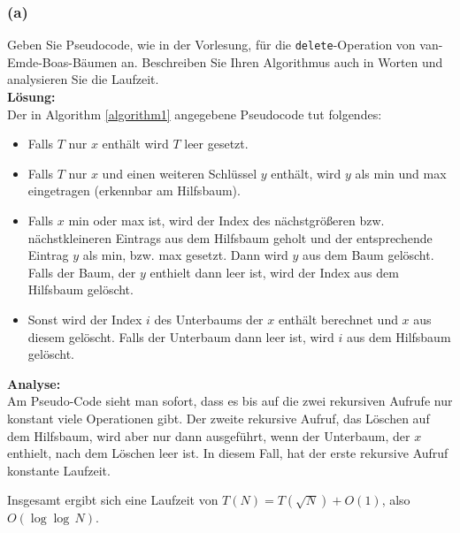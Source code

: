 \subsubsection*{(a)}


Geben Sie Pseudocode, wie in der Vorlesung, für die \lstinline|delete|-Operation von van-Emde-Boas-Bäumen an. Beschreiben Sie Ihren Algorithmus auch in Worten und analysieren Sie die Laufzeit.\\

\noindent\textbf{Lösung:}\\
Der in Algorithm \ref{algorithm1} angegebene Pseudocode tut folgendes:
\begin{itemize}
	\item Falls $T$ nur $x$ enthält wird $T$ leer gesetzt.
	\item Falls $T$ nur $x$ und einen weiteren Schlüssel $y$ enthält, wird $y$ als min und max eingetragen (erkennbar am Hilfsbaum).
	\item Falls $x$ min oder max ist, wird der Index des nächstgrößeren bzw. nächstkleineren Eintrags  aus dem Hilfsbaum geholt und der entsprechende Eintrag $y$ als min, bzw. max gesetzt. Dann wird $y$ aus dem Baum gelöscht. Falls der Baum, der $y$ enthielt dann leer ist, wird der Index aus dem Hilfsbaum gelöscht.
	\item Sonst wird der Index $i$ des Unterbaums der $x$ enthält berechnet und $x$ aus diesem gelöscht. Falls der Unterbaum dann leer ist, wird $i$ aus dem Hilfsbaum gelöscht.
\end{itemize}
\noindent\textbf{Analyse:}\\
Am Pseudo-Code sieht man sofort, dass es bis auf die zwei rekursiven Aufrufe nur konstant viele Operationen gibt. Der zweite rekursive Aufruf, das Löschen auf dem Hilfsbaum, wird aber nur dann ausgeführt, wenn der Unterbaum, der $x$ enthielt, nach dem Löschen leer ist. In diesem Fall, hat der erste rekursive Aufruf konstante Laufzeit.

Insgesamt ergibt sich eine Laufzeit von $T(N) = T(\sqrt{N}) + O(1)$, also $O(\log\log \, N)$.

